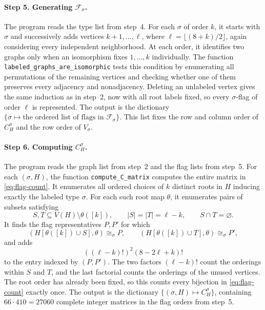 \documentclass[11pt]{article}
\begin{document}
\paragraph{Step 5. Generating $\mathcal F_\sigma$.}
The program \href{https://github.com/Diudiutse/triangle-free-signless-laplacian/blob/main/programs/05_generate_flags.py}{} reads the type list from step~4.
For each $\sigma$ of order $k$, it starts with $\sigma$ and successively
adds vertices $k+1,\ldots,\ell$, where $\ell=\lfloor(8+k)/2\rfloor$,
again considering every independent neighborhood.
At each order, it identifies two graphs only when an isomorphism fixes
$1,\ldots,k$ individually.
The function \texttt{labeled\_graphs\_are\_isomorphic} tests this condition
by enumerating all permutations of the remaining vertices and checking
whether one of them preserves every adjacency and nonadjacency.
Deleting an unlabeled vertex gives the same induction as in step~2,
now with all root labels fixed, so every $\sigma$-flag of order $\ell$ is represented.
The output \href{https://github.com/Diudiutse/triangle-free-signless-laplacian/blob/main/programs/results/05/F_sigma.pkl}{} is the dictionary
$\{\sigma\mapsto\text{the ordered list of flags in }\mathcal F_\sigma\}$.
This list fixes the row and column order of $C_H^\sigma$ and the row
order of $V_\sigma$.

\paragraph{Step 6. Computing $C_H^\sigma$.}
The program \href{https://github.com/Diudiutse/triangle-free-signless-laplacian/blob/main/programs/06_compute_C.py}{} reads the graph list from step~2 and
the flag lists from step~5.
For each $(\sigma,H)$, the function \texttt{compute\_C\_matrix} computes the
entire matrix in \eqref{eq:flag-count}.
It enumerates all ordered choices of $k$ distinct roots in $H$ inducing
exactly the labeled type $\sigma$.
For each such root map $\theta$, it enumerates pairs of subsets satisfying
\[
S,T\subseteq V(H)\setminus\theta([k]),\qquad
|S|=|T|=\ell-k,\qquad S\cap T=\varnothing.
\]
It finds the flag representatives $P,P'$ for which
\[
(H[\theta([k])\cup S],\theta)\cong_\sigma P,
\qquad
(H[\theta([k])\cup T],\theta)\cong_\sigma P',
\]
and adds
\[
((\ell-k)!)^2(8-2\ell+k)!
\]
to the entry indexed by $(P,P')$.
The two factors $(\ell-k)!$ count the orderings within $S$ and $T$,
and the last factorial counts the orderings of the unused vertices.
The root order has already been fixed, so this counts every bijection in
\eqref{eq:flag-count} exactly once.
The output \href{https://github.com/Diudiutse/triangle-free-signless-laplacian/blob/main/programs/results/06/C.pkl}{} is the dictionary
$\{(\sigma,H)\mapsto C_H^\sigma\}$, containing $66\cdot410=27060$ complete
integer matrices in the flag orders from step~5.
\end{document}

